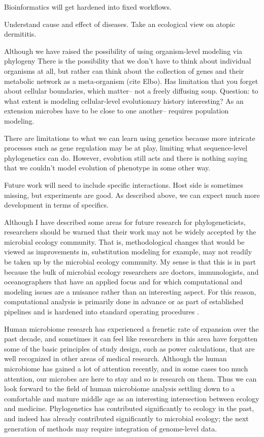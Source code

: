 \documentclass{amsart}
\begin{document}
Bioinformatics will get hardened into fixed workflows.

Understand cause and effect of diseases.
Take an ecological view on atopic dermititis.

Although we have raised the possibility of using organism-level modeling via phylogeny
There is the possibility that we don't have to think about individual organisms at all, but rather can think about the collection of genes and their metabolic network as a meta-organism (cite Elbo).
Has limitation that you forget about cellular boundaries, which matter-- not a freely diffusing soup.
Question: to what extent is modeling cellular-level evolutionary history interesting?
As an extension microbes have to be close to one another-- requires population modeling.

There are limitations to what we can learn using genetics because more intricate processes such as gene regulation may be at play, limiting what sequence-level phylogenetics can do.
However, evolution still acts and there is nothing saying that we couldn't model evolution of phenotype in some other way.

Future work will need to include specific interactions.
Host side is sometimes missing, but experiments are good.
As described above, we can expect much more development in terms of specifics.
\citep{hooper2012interactions}

Although I have described some areas for future research for phylogeneticists, researchers should be warned that their work may not be widely accepted by the microbial ecology community.
That is, methodological changes that would be viewed as improvements in, substitution modeling for example, may not readily be taken up by the microbial ecology community.
My sense is that this is in part because the bulk of microbial ecology researchers are doctors, immunologists, and oceanographers that have an applied focus and for which computational and modeling issues are a nuisance rather than an interesting aspect.
For this reason, computational analysis is primarily done in advance or as part of established pipelines and is hardened into standard operating procedures \citep{peplies2008standard}.

Human microbiome research has experienced a frenetic rate of expansion over the past decade, and sometimes it can feel like researchers in this area have forgotten some of the basic principles of study design, such as power calculations, that are well recognized in other areas of medical research.
Although the human microbiome has gained a lot of attention recently, and in some cases too much attention, our microbes are here to stay and so is research on them.
Thus we can look forward to the field of human microbiome analysis settling down to a comfortable and mature middle age as an interesting intersection between ecology and medicine.
Phylogenetics has contributed significantly to ecology in the past, and indeed has already contributed significantly to microbial ecology; the next generation of methods may require integration of genome-level data.
\end{document}

